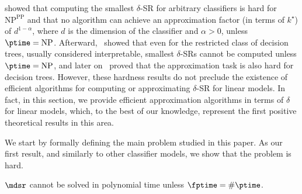 \citet{Waldchen_MacDonald_Hauch_Kutyniok_2021} showed that computing the smallest $\delta$-SR for arbitrary classifiers is hard for $\textrm{NP}^{\textrm{PP}}$ and that no algorithm can achieve an approximation factor (in terms of $k^\star$) of $d^{1-\alpha}$,  where $d$ is the dimension of the classifier and $\alpha > 0$, unless $\ptime = \textrm{NP}$. Afterward,~\citet{Arenas_Barcelo_Romero_Subercaseaux_2022} showed that even for the restricted class of decision trees, usually considered interpretable, smallest $\delta$-SRs cannot be computed unless $\ptime = \textrm{NP}$, and later on~\citet{Kozachinskiy_2023} proved that the approximation task is also hard for decision trees.
However, these hardness results do not preclude the existence of efficient algorithms for computing or approximating $\delta$-SR for linear models. In fact, in this section, we provide efficient approximation algorithms in terms of $\delta$ for linear models, which, to the best of our knowledge, represent the first positive theoretical results in this area.


We start by formally defining the main problem studied in this paper.
\csproblem{\mdsr}{A linear model $\M$, an instance $\vx$, and a value $\delta \in (0, 1]$}{$k^\star(\M, \vx, \delta)$}
As our first result, and similarly to other classifier models, we show
that the problem is hard.
%
\begin{proposition}\label{prop:hardness}
    $\mdsr$ cannot be solved in polynomial time unless $\fptime = \# \ptime$.
\end{proposition}



